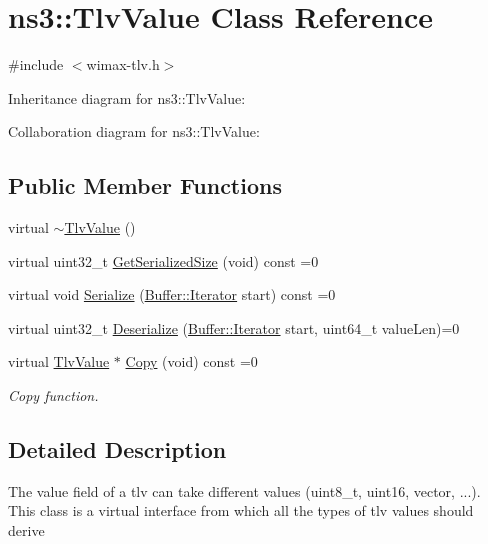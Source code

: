 \hypertarget{classns3_1_1TlvValue}{}\section{ns3\+:\+:Tlv\+Value Class Reference}
\label{classns3_1_1TlvValue}


{\ttfamily \#include $<$wimax-\/tlv.\+h$>$}



Inheritance diagram for ns3\+:\+:Tlv\+Value\+:


Collaboration diagram for ns3\+:\+:Tlv\+Value\+:
\subsection*{Public Member Functions}
\begin{DoxyCompactItemize}
\item 
virtual \hyperlink{classns3_1_1TlvValue_a03ab7cacadcc9829e270085f2d0b5fe3}{$\sim$\+Tlv\+Value} ()
\item 
virtual uint32\+\_\+t \hyperlink{classns3_1_1TlvValue_a5b799b0eaf3fb2cc1fef96335d9eeb32}{Get\+Serialized\+Size} (void) const =0
\item 
virtual void \hyperlink{classns3_1_1TlvValue_aeec8825728398e18337efd9cb40a2aa4}{Serialize} (\hyperlink{classns3_1_1Buffer_1_1Iterator}{Buffer\+::\+Iterator} start) const =0
\item 
virtual uint32\+\_\+t \hyperlink{classns3_1_1TlvValue_a0c302c99e56f6a20e424839f92f07c7b}{Deserialize} (\hyperlink{classns3_1_1Buffer_1_1Iterator}{Buffer\+::\+Iterator} start, uint64\+\_\+t value\+Len)=0
\item 
virtual \hyperlink{classns3_1_1TlvValue}{Tlv\+Value} $\ast$ \hyperlink{classns3_1_1TlvValue_aefbf94f1455b233c9a0d10f39526c5ff}{Copy} (void) const =0
\begin{DoxyCompactList}\small\item\em Copy function. \end{DoxyCompactList}\end{DoxyCompactItemize}


\subsection{Detailed Description}
The value field of a tlv can take different values (uint8\+\_\+t, uint16, vector, ...). This class is a virtual interface from which all the types of tlv values should derive 

